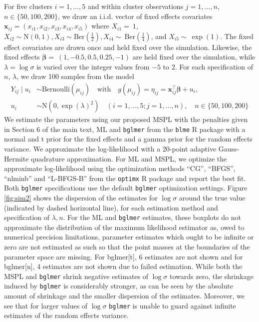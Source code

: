 \documentclass[11pt, a4paper]{article}
\newcommand*{\bb}{\boldsymbol}
\theoremstyle{example} \newtheorem{example}{Example}[section]
\theoremstyle{theorem} \newtheorem{theorem}{Theorem}[section]
\theoremstyle{theorem }\newtheorem{proposition}{Proposition}[section]
\theoremstyle{theorem }\newtheorem{corollary}{Corollary}[section]
\def\\bbeta{\bb{\\bbeta}}
\def\bx{\bb{x}}
\begin{document}
For five clusters $i=1,\ldots,5$ and within cluster observations $j=1,\ldots,n$, $n \in \{50,100,200\}$, we draw an i.i.d. vector of fixed effects covariates $\bx_{ij} = (x_{i1},x_{i2},x_{i3},x_{i4},x_{i5})$ where $X_{i1}=~1$, ${X}_{i2} \sim \text{N}(0,1), {X}_{i3}\sim \textrm{Ber}\left(\frac{1}{2}\right), {X}_{i4}\sim~\textrm{Ber}\left(\frac{1}{4}\right)$, and ${X}_{i5}\sim~\exp(1)$. The fixed effect covariates are drawn once and held fixed over the simulation. Likewise, the fixed effects $\bb \beta  =~(1,-0.5,0.5,0.25,-1)$ are held fixed over the simulation, while $\lambda = \log \sigma$ is varied  over the integer values from $-5$ to $2$. For each specification of $n$, $\lambda$, we draw 100 samples from the model 
\begin{equation}
\begin{aligned}
\label{eq:sim2_model} 
Y_{ij} \mid {u}_i & \sim \text{Bernoulli}(\mu_{ij}) \quad \text{with} \quad
g(\mu_{ij}) = \eta_{ij} = \bx_{ij}^\top \bb \beta + u_i,\\
u_i & \sim \text{N}(0, \exp (\lambda)^2 )  \quad (i = 1, \ldots, 5; j = 1, \ldots, n), \quad n\in \{50,100,200\}
\end{aligned}
\end{equation}
We estimate the parameters using our proposed MSPL with the penalties given in Section 6 of the main text, ML and \texttt{bglmer}  from the \texttt{blme} R package \citep{chung+etal:2013} with a normal and t prior for the fixed effects and a gamma prior for the random effects variance. We approximate the log-likelihood with a 20-point adaptive Gauss-Hermite quadrature approximation. For ML and MSPL, we optimize the approximate log-likelihood using the optimization methods ``CG'', ``BFGS'', ``nlminb'' and ``L-BFGS-B'' from the \texttt{optimx} R package \citep{nash:2014} and report the best fit. Both \texttt{bglmer} specifications use the default \texttt{bglmer} optimization settings. Figure \ref{fig:sim2} shows the dispersion of the estimates for $\log \sigma$ around the true value (indicated by dashed horizontal line), for each estimation method and specification of $\lambda ,n$. For the ML and \texttt{bglmer} estimates, these boxplots do not approximate the distribution of the maximum likelihood estimator as, owed to numerical precision limitations, parameter estimates which ought to be infinite or zero are not estimated as such so that the point masses at the boundaries of the parameter space are missing. For bglmer[t], 6 estimates are not shown and for bglmer[n], 4 estimates are not shown due to failed estimation. While both the MSPL and \texttt{bglmer} shrink negative estimates of $\log \sigma$ towards zero, the shrinkage induced by \texttt{bglmer} is considerably stronger, as can be seen by the absolute amount of shrinkage and the smaller dispersion of the estimates. Moreover, we see that for larger values of $\log \sigma$ \texttt{bglmer} is unable to guard against infinite estimates of the random effects variance. 
\end{document}
